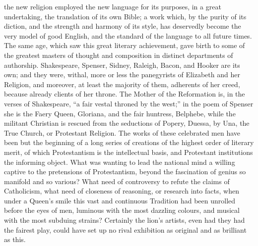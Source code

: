 the new religion employed the new language for its
purposes, in a great undertaking, the translation of its
own Bible; a work which, by the purity of its diction,
and the strength and harmony of its style, has deservedly
become the very model of good English, and the standard
of the language to all future times. The same age, which
saw this great literary achievement, gave birth to some
of the greatest masters of thought and composition in
distinct departments of authorship. Shakespeare, Spenser,
Sidney, Raleigh, Bacon, and Hooker are its own; and they
were, withal, more or less the panegyrists of Elizabeth
and her Religion, and moreover, at least the majority of
them, adherents of her creed, because already clients of
her throne. The Mother of the Reformation is, in the
verses of Shakespeare, ``a fair vestal throned by the
west;'' in the poem of Spenser she is the Faery
Queen, Gloriana, and the fair huntress, Belphebe, while
the militant Christian is rescued from the seductions of
Popery, Duessa, by Una, the True Church, or Protestant
Religion. The works of these celebrated men have been but
the beginning of a long series of creations of the
highest order of literary merit, of which Protestantism
is the intellectual basis, and Protestant institutions
the informing object. What was wanting to lead the
national mind a willing captive to the pretensions of
Protestantism, beyond the fascination of genius so
manifold and so various? What need of controversy to
refute the claims of Catholicism, what need of closeness
of reasoning, or research into facts, when under a
Queen's smile this vast and continuous Tradition had been
unrolled before the eyes of men, luminous with the most
dazzling colours, and musical with the most subduing
strains? Certainly the lion's artists, even had they had
the fairest play, could have set up no rival exhibition
as original and as brilliant as this.

